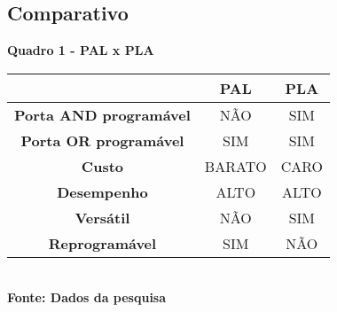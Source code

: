 \subsection{Comparativo}
\begin{center}
	\centering
	 \textbf{Quadro 1 - PAL x PLA}\\
  \label{quadro1}
  \begin{tabular}{|c|c|c|} \hline
	\multicolumn{1}{|c|}{\textbf{}} &	\multicolumn{1}{|c|}{\textbf{PAL}} & \multicolumn{1}{|c|}{\textbf{PLA}} \\ 	  
  \hline \textbf{Porta AND programável} & NÃO & SIM\\ 
   \hline \textbf{Porta OR programável}  & SIM & SIM \\ 
  \hline \textbf{Custo} & BARATO & CARO \\ 
  \hline \textbf{Desempenho} & ALTO & ALTO \\ 
  \hline \textbf{Versátil} & NÃO & SIM \\ 
  \hline \textbf{Reprogramável} & SIM & NÃO \\ 
  \hline
\end{tabular}
\vspace{0.1cm} 
{\footnotesize\\ \textbf{Fonte: Dados da pesquisa}}
\end{center}


